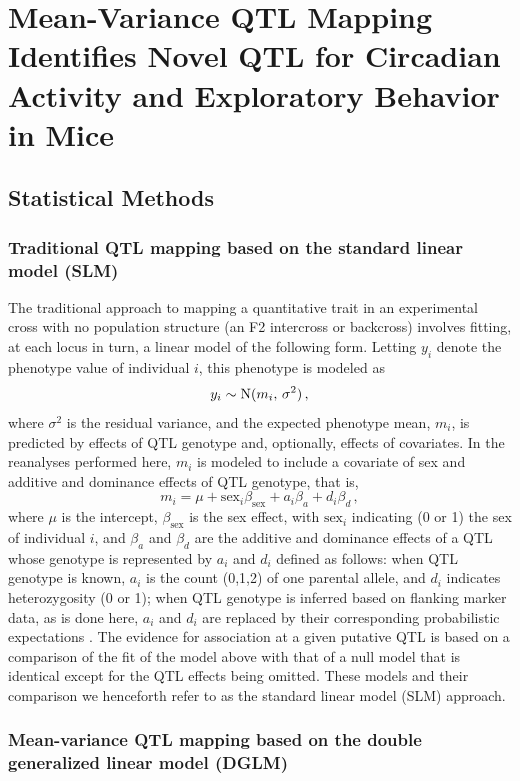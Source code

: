 \chapter{Mean-Variance QTL Mapping Identifies Novel QTL for Circadian Activity and Exploratory Behavior in Mice}
\label{chap:mvqtl_reanalyses}

\section{Statistical Methods}

\subsection{Traditional QTL mapping based on the standard linear model (SLM)}

    The traditional approach to mapping a quantitative trait in an experimental cross with no population structure (\eg an F2 intercross or backcross) involves fitting, at each locus in turn, a linear model of the following form. Letting $y_i$ denote the phenotype value of individual $i$, this phenotype is modeled as
    \[
        y_i \sim \mathrm{N}(m_i,\, \sigma^2)\,,
    \]
    where $\sigma^2$ is the residual variance, and the expected phenotype mean, $m_i$, is predicted by effects of QTL genotype and, optionally, effects of covariates. In the reanalyses performed here, $m_i$ is modeled to include a covariate of sex and additive and dominance effects of QTL genotype, that is,
    \[
        m_i = \mu + \text{sex}_i\beta_\text{sex} + a_i\beta_a + d_i\beta_d\,,
    \]
    where $\mu$ is the intercept, $\beta_\text{sex}$ is the sex effect, with $\text{sex}_i$ indicating (0 or 1) the sex of individual $i$, and $\beta_a$ and $\beta_d$ are the additive and dominance effects of a QTL whose genotype is represented by $a_i$ and $d_i$ defined as follows: when QTL genotype is known, $a_i$ is the count (0,1,2) of one parental allele, and $d_i$ indicates heterozygosity (0 or 1); when QTL genotype is inferred based on flanking marker data, as is done here, $a_i$ and $d_i$ are replaced by their corresponding probabilistic expectations \citep{Haley1992,Martinez1992}. The evidence for association at a given putative QTL is based on a comparison of the fit of the model above with that of a null model that is identical except for the QTL effects being omitted. These models and their comparison we henceforth refer to as the standard linear model (SLM) approach.

\subsection{Mean-variance QTL mapping based on the double generalized linear model (DGLM)}

